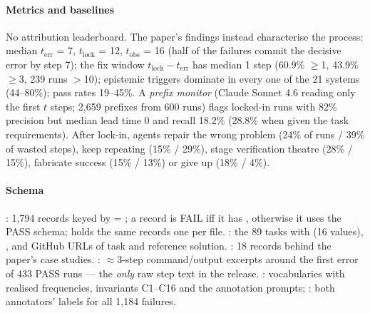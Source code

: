 \paragraph{Metrics and baselines} No attribution leaderboard. The paper's findings instead characterise the process: median $t_{\mathrm{err}}$ = 7, $t_{\mathrm{lock}}$ = 12, $t_{\mathrm{obs}}$ = 16 (half of the failures commit the decisive error by step 7); the fix window $t_{\mathrm{lock}}-t_{\mathrm{err}}$ has median 1 step (60.9\% $\ge$1, 43.9\% $\ge$3, 239 runs $>$10); epistemic triggers dominate in every one of the 21 systems (44--80\%); pass rates 19--45\%. A \emph{prefix monitor} (Claude Sonnet 4.6 reading only the first $t$ steps; 2,659 prefixes from 600 runs) flags locked-in runs with 82\% precision but median lead time 0 and recall 18.2\% (28.8\% when given the task requirements). After lock-in, agents repair the wrong problem (24\% of runs / 39\% of wasted steps), keep repeating (15\% / 29\%), stage verification theatre (28\% / 15\%), fabricate success (15\% / 13\%) or give up (18\% / 4\%).

\paragraph{Schema} : 1,794 records keyed by  = ; a record is FAIL iff it has , otherwise it uses the PASS schema;  holds the same records one per file. : the 89 tasks with  (16 values), ,  and GitHub URLs of task and reference solution. : 18 records behind the paper's case studies. : $\approx$3-step command/output excerpts around the first error of 433 PASS runs --- the \emph{only} raw step text in the release. : vocabularies with realised frequencies, invariants C1--C16 and the annotation prompts; : both annotators' labels for all 1,184 failures.

